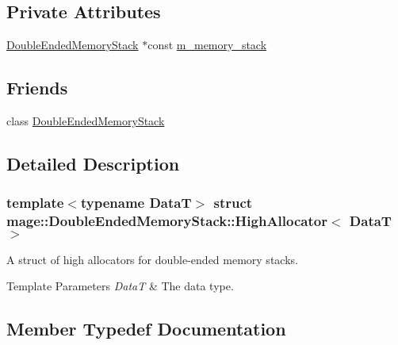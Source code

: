 \subsection*{Private Attributes}
\begin{DoxyCompactItemize}
\item 
\hyperlink{classmage_1_1_double_ended_memory_stack}{Double\+Ended\+Memory\+Stack} $\ast$const \hyperlink{structmage_1_1_double_ended_memory_stack_1_1_high_allocator_afb9b7e67c0af8061cda859426a1f929b}{m\+\_\+memory\+\_\+stack}
\end{DoxyCompactItemize}
\subsection*{Friends}
\begin{DoxyCompactItemize}
\item 
class \hyperlink{structmage_1_1_double_ended_memory_stack_1_1_high_allocator_a10ae729d55b8c0017057250445835680}{Double\+Ended\+Memory\+Stack}
\end{DoxyCompactItemize}


\subsection{Detailed Description}
\subsubsection*{template$<$typename DataT$>$\newline
struct mage\+::\+Double\+Ended\+Memory\+Stack\+::\+High\+Allocator$<$ Data\+T $>$}

A struct of high allocators for double-\/ended memory stacks.


\begin{DoxyTemplParams}{Template Parameters}
{\em DataT} & The data type. \\
\hline
\end{DoxyTemplParams}


\subsection{Member Typedef Documentation}
\hypertarget{structmage_1_1_double_ended_memory_stack_1_1_high_allocator_ab0d52e1c59565e79f3bd5f0f02e65966}{}\label{structmage_1_1_double_ended_memory_stack_1_1_high_allocator_ab0d52e1c59565e79f3bd5f0f02e65966} 
